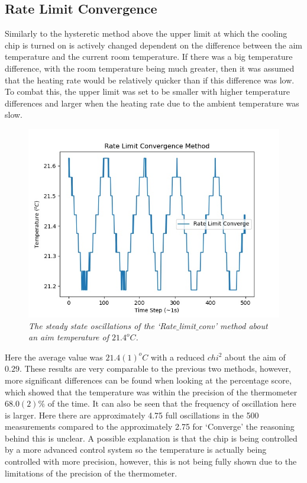 \documentclass[10pt]{article}
\begin{document}
\subsection*{Rate Limit Convergence}
Similarly to the hysteretic method above the upper limit at which the cooling chip is turned on is actively changed dependent on the difference between the aim temperature and the current room temperature. If there was a big temperature difference, with the room temperature being much greater, then it was assumed that the heating rate would be relatively quicker than if this difference was low. To combat this, the upper limit was set to be smaller with higher temperature differences and larger when the heating rate due to the ambient temperature was slow.\\

\begin{figure}[t]
    \centering
    \includegraphics[scale=0.75]{rate_lim.jpg}
    \caption{\it{The steady state oscillations of the `Rate$\_$limit$\_$conv' method about an aim temperature of $21.4^oC$.}}
    \label{fig:rate}
\end{figure}

Here the average value was $21.4(1)^oC$ with a reduced $chi^2$ about the aim of $0.29$. These results are very comparable to the previous two methods, however, more significant differences can be found when looking at the percentage score, which showed that the temperature was within the precision of the thermometer $68.0(2)\%$ of the time. It can also be seen that the frequency of oscillation here is larger. Here there are approximately 4.75 full oscillations in the 500 measurements compared to the approximately 2.75 for `Converge' the reasoning behind this is unclear. A possible explanation is that the chip is being controlled by a more advanced control system so the temperature is actually being controlled with more precision, however, this is not being fully shown due to the limitations of the precision of the thermometer.\\
\newpage
\end{document}
